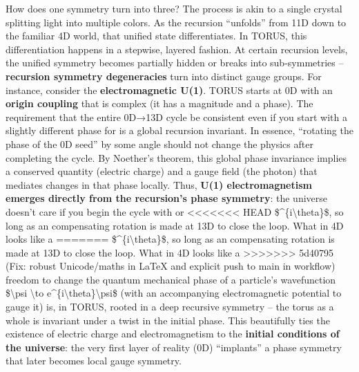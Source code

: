 \documentclass[]{article}
\begin{document}
How does one symmetry turn into three? The process is akin to a single
crystal splitting light into multiple colors. As the recursion
``unfolds'' from 11D down to the familiar 4D world, that unified state
differentiates. In TORUS, this differentiation happens in a stepwise,
layered fashion. At certain recursion levels, the unified symmetry
becomes partially hidden or breaks into sub-symmetries --
\textbf{recursion symmetry degeneracies} turn into distinct gauge
groups. For instance, consider the \textbf{electromagnetic U(1)}. TORUS
starts at 0D with an \textbf{origin coupling \alpha} that is complex (it has
a magnitude and a phase). The requirement that the entire 0D→13D cycle
be consistent even if you start with a slightly different phase for \alpha is
a global recursion invariant. In essence, ``rotating the phase of the 0D
seed'' by some angle should not change the physics after completing the
cycle​. By Noether's theorem, this global phase invariance implies a
conserved quantity (electric charge) and a gauge field (the photon) that
mediates changes in that phase locally. Thus, \textbf{U(1)
electromagnetism emerges directly from the recursion's phase symmetry}:
the universe doesn't care if you begin the cycle with \alpha or
<<<<<<< HEAD
\$\alphae\^{}\{i\textbackslash theta\}\$, so long as an compensating rotation
is made at 13D to close the loop\hspace{0pt}. What in 4D looks like a
=======
\$\alphae\^{}\{i\textbackslash{}theta\}\$, so long as an compensating
rotation is made at 13D to close the loop​. What in 4D looks like a
>>>>>>> 5d40795 (Fix: robust Unicode/maths in LaTeX and explicit push to main in workflow)
freedom to change the quantum mechanical phase of a particle's
wavefunction \$\textbackslash{}psi \textbackslash{}to
e\^{}\{i\textbackslash{}theta\}\textbackslash{}psi\$ (with an
accompanying electromagnetic potential to gauge it) is, in TORUS, rooted
in a deep recursive symmetry -- the torus as a whole is invariant under
a twist in the initial phase. This beautifully ties the existence of
electric charge and electromagnetism to the \textbf{initial conditions
of the universe}: the very first layer of reality (0D) ``implants'' a
phase symmetry that later becomes local gauge symmetry.
\end{document}
